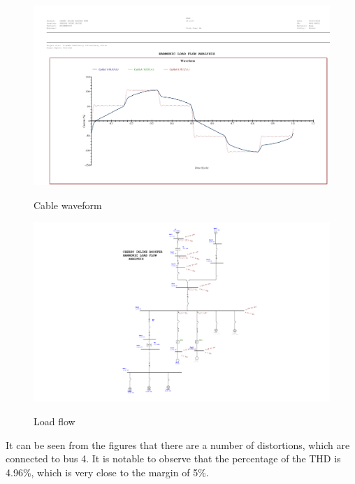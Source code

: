 \begin{figure}[!htb]
	\includegraphics[width=\textwidth]{figures/che_cable_harmonic_waveform.pdf} \\
	\caption{Cable waveform}
	\label{fig_ch04_elecaudit_che_cable_harmonic_waveform} 
\end{figure}

\begin{figure}[!htb]
	\includegraphics[width=\textwidth]{figures/che_harmonic_load_flow.pdf} \\
	\caption{Load flow}
	\label{fig_ch04_elecaudit_che_harmonic_load_flow} 
\end{figure}

It can be seen from the figures that there are a number of distortions, which are connected to bus 4. It is notable to observe that the percentage of the THD is 4.96\%, which is very close to the margin of 5\%.


